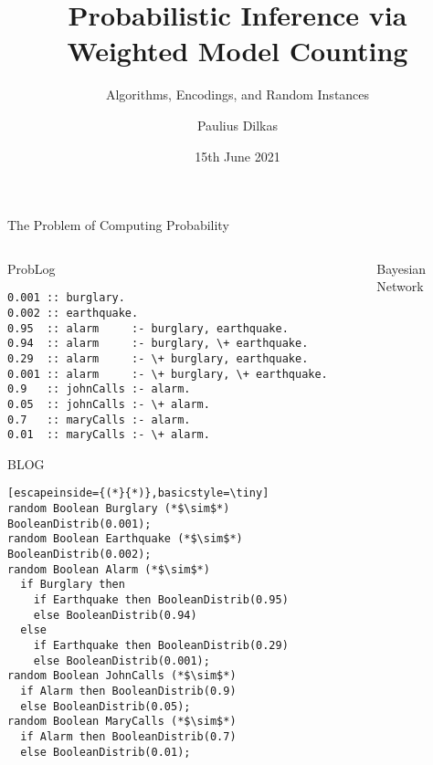 \documentclass{beamer}
\author{Paulius Dilkas}
\title{Probabilistic Inference via Weighted Model Counting}
\subtitle{Algorithms, Encodings, and Random Instances}
\date{15th June 2021}
\begin{document}
\maketitle

\begin{frame}[fragile]{The Problem of Computing Probability}
  \vspace{-0.75cm}
  \begin{columns}[t]
    \begin{column}{0.65\textwidth}
      \centering
      \begin{block}{ProbLog}
        \vspace{-0.2cm}
        \begin{lstlisting}[basicstyle=\tiny]
0.001 :: burglary.
0.002 :: earthquake.
0.95  :: alarm     :- burglary, earthquake.
0.94  :: alarm     :- burglary, \+ earthquake.
0.29  :: alarm     :- \+ burglary, earthquake.
0.001 :: alarm     :- \+ burglary, \+ earthquake.
0.9   :: johnCalls :- alarm.
0.05  :: johnCalls :- \+ alarm.
0.7   :: maryCalls :- alarm.
0.01  :: maryCalls :- \+ alarm.
        \end{lstlisting}
        \vspace{-0.2cm}
      \end{block}
      \vspace{-0.25cm}
      \begin{block}{BLOG}
        \vspace{-0.2cm}
        \begin{lstlisting}[escapeinside={(*}{*)},basicstyle=\tiny]
random Boolean Burglary (*$\sim$*) BooleanDistrib(0.001);
random Boolean Earthquake (*$\sim$*) BooleanDistrib(0.002);
random Boolean Alarm (*$\sim$*)
  if Burglary then
    if Earthquake then BooleanDistrib(0.95)
    else BooleanDistrib(0.94)
  else
    if Earthquake then BooleanDistrib(0.29)
    else BooleanDistrib(0.001);
random Boolean JohnCalls (*$\sim$*)
  if Alarm then BooleanDistrib(0.9)
  else BooleanDistrib(0.05);
random Boolean MaryCalls (*$\sim$*)
  if Alarm then BooleanDistrib(0.7)
  else BooleanDistrib(0.01);
        \end{lstlisting}
        \vspace{-0.2cm}
      \end{block}
    \end{column}
    \begin{column}{0.35\textwidth}
      \begin{block}{Bayesian Network}
        \centering
        \begin{tikzpicture}[node distance=2cm,scale=0.5,every node/.style={scale=0.5}]

\end{tikzpicture}
\end{block}
\end{column}
\end{columns}
\end{frame}
\end{document}
